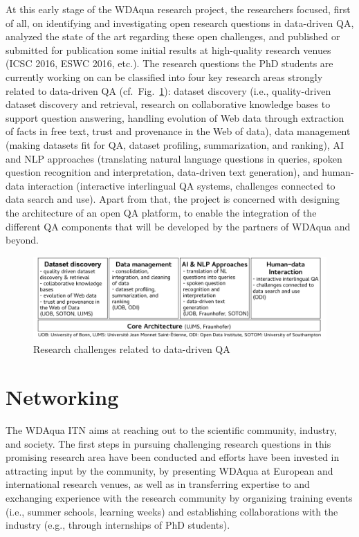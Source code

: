 \documentclass[a4paper]{llncs}
\newcommand{\christoph}[1]{\todo{Christoph: #1}}
\begin{document}
	At this early stage of the WDAqua research project, the researchers focused, first of all, on identifying and investigating open research questions in data-driven QA, analyzed the state of the art regarding these open challenges, and published or submitted for publication some initial results at high-quality research venues (ICSC 2016, ESWC 2016, etc.).
	The research questions the PhD students are currently working on can be classified into four key research areas strongly related to data-driven QA (cf.\ Fig.~\ref{fig:figure}): 
	dataset discovery (i.e., quality-driven dataset discovery and retrieval, research on collaborative knowledge bases to support question answering, handling evolution of Web data through extraction of facts in free text, trust and provenance in the Web of data), data management (making datasets fit for QA, dataset profiling, summarization, and ranking), AI and NLP approaches (translating natural language questions in queries, spoken question recognition and interpretation, data-driven text generation), and human-data interaction (interactive interlingual QA systems, challenges connected to data search and use).
        Apart from that, the project is concerned with designing the architecture of an open QA platform, to enable the integration of the different QA components that will be developed by the partners of WDAqua and beyond.
	\begin{figure}[htpb!]
	    \centering
	    \includegraphics[width=\textwidth]{figure.pdf}
		\caption{Research challenges related to data-driven QA}
		\label{fig:figure}
	\end{figure}

	\section{Networking} \label{sec:networking}
	The WDAqua ITN aims at reaching out to the scientific community, industry, and society.
        The first steps in pursuing challenging research questions in this promising research area have been conducted and efforts have been invested in attracting input by the community, by presenting WDAqua at European and international research venues, as well as in transferring expertise to and exchanging experience with the research community by organizing training events (i.e., summer schools, learning weeks) and establishing collaborations with the industry (e.g., through internships of PhD students).
	
\end{document}

